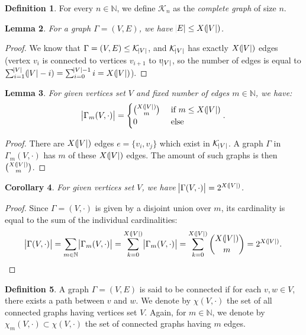 \documentclass{article}
\newtheorem{lemma}{Lemma}[section]
\newtheorem{corollary}[lemma]{Corollary}
\theoremstyle{definition}
\newtheorem{definition}[lemma]{Definition}
\theoremstyle{remark}
\newcommand{\N}{\mathbb N}
\begin{document}
		\begin{definition} For every $n \in \N$, we define $\mathcal K_n$ as the \textit{complete graph} of size $n$.
		\end{definition}

		\begin{lemma} For a graph $\Gamma = (V, E)$, we have $\abs E \leq X(\abs V)$.
		\end{lemma}

		\begin{proof} We know that $\Gamma = (V, E) \leq \mathcal K_{\abs V}$, and $\mathcal K_{\abs V}$ has exactly $X(\abs V)$ edges (vertex $v_i$ is connected
		to vertices $v_{i+1}$ to $v_{\abs V}$, so the number of edges is equal to $\sum_{i=1}^{\abs V}(\abs V - i) = \sum_{i=0}^{\abs V - 1}i = X(\abs V)$).
		\end{proof}

		\begin{lemma} For given vertices set $V$ and fixed number of edges $m \in \N$, we have:
		\[\abs {\Gamma_m(V, \cdot)} = \begin{cases}\binom {X(\abs V)}m &\text{ if } m \leq X(\abs V) \\0 &\text{ else}\end{cases}.\]
		\end{lemma}

		\begin{proof} There are $X(\abs V)$ edges $e = \{v_i, v_j\}$ which exist in $\mathcal K_{\abs V}$. A graph $\Gamma$ in $\Gamma_m(V, \cdot)$
		has $m$ of these $X(\abs V)$ edges. The amount of such graphs is then $\binom {X(\abs V)}m$.
		\end{proof}

		\begin{corollary} For given vertices set $V$, we have $\abs {\Gamma(V, \cdot)} = 2^{X(\abs V)}$.
		\end{corollary}

		\begin{proof} Since $\Gamma = (V, \cdot)$ is given by a disjoint union over $m$, its cardinality is equal to the sum of the individual cardinalities:
		\[\abs {\Gamma(V, \cdot)} = \sum_{m \in \N}\abs {\Gamma_m(V, \cdot)} = \sum_{k=0}^{X(\abs V)}\abs {\Gamma_m(V, \cdot)}
			= \sum_{k=0}^{X(\abs V)}\binom {X(\abs V)}m = 2^{X(\abs V)}.\]
		\end{proof}

		\begin{definition} A graph $\Gamma = (V, E)$ is said to be connected if for each $v, w \in V$, there exists a path between $v$ and $w$. We denote by
		$\chi(V, \cdot)$ the set of all connected graphs having vertices set $V$. Again, for $m \in \N$, we denote by $\chi_m(V, \cdot) \subset \chi(V, \cdot)$
		the set of connected graphs having $m$ edges.
		\end{definition}
\end{document}
